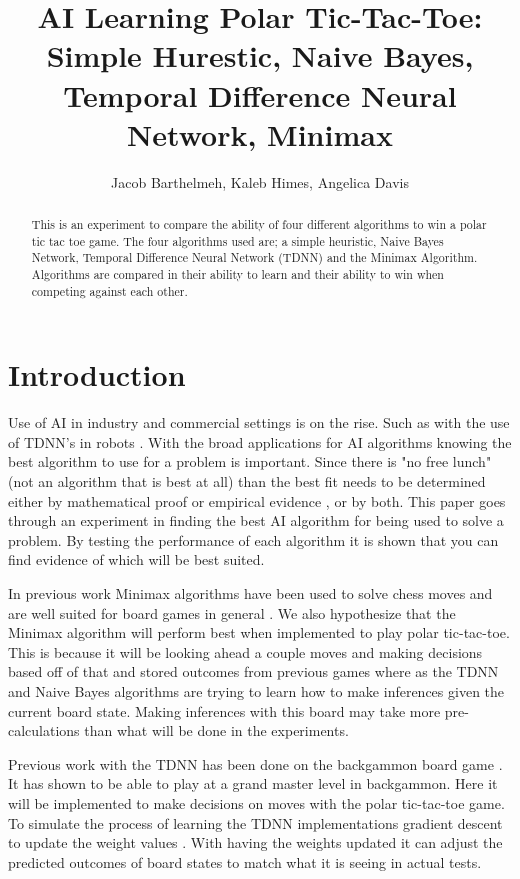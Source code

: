 \documentclass[12pt,letterpaper]{article}
\title{AI Learning Polar Tic-Tac-Toe: \\ Simple Hurestic, Naive Bayes, Temporal Difference Neural Network, Minimax}
\author{Jacob Barthelmeh, Kaleb Himes, Angelica Davis}
\begin{document}
\maketitle

\begin{abstract}
This is an experiment to compare the ability of four different algorithms to win a polar tic tac toe game. The four algorithms used are; a simple heuristic, Naive Bayes Network, Temporal Difference Neural Network (TDNN) and the Minimax Algorithm. Algorithms are compared in their ability to learn and their ability to win when competing against each other.
\end{abstract}

\section{Introduction}
Use of AI in industry and commercial settings is on the rise. Such as with the use of TDNN's in robots \cite{robotTDNN}. With the broad applications for AI algorithms knowing the best algorithm to use for a problem is important. Since there is "no free lunch" (not an algorithm that is best at all) than the best fit needs to be determined either by mathematical proof or empirical evidence , or by both. This paper goes through an experiment in finding the best AI algorithm for being used to solve a problem. By testing the performance of each algorithm it is shown that you can find evidence of which will be best suited.
 
In previous work Minimax algorithms have been used to solve chess moves and are well suited for board games in general \cite{flyingMinimax}. We also hypothesize that the Minimax algorithm will perform best when implemented to play polar tic-tac-toe. This is because it will be looking ahead a couple moves and making decisions based off of that and stored outcomes from previous games where as the TDNN and Naive Bayes algorithms are trying to learn how to make inferences given the current board state. Making inferences with this board may take more pre-calculations than what will be done in the experiments.

Previous work with the TDNN has been done on the backgammon board game \cite{stanfordTDNN}. It has shown to be able to play at a grand master level in backgammon. Here it will be implemented to make decisions on moves with the polar tic-tac-toe game. To simulate the process of learning the TDNN implementations gradient descent to update the weight values \cite{gradientTDNN}. With having the weights updated it can adjust the predicted outcomes of board states to match what it is seeing in actual tests. 
\end{document}
